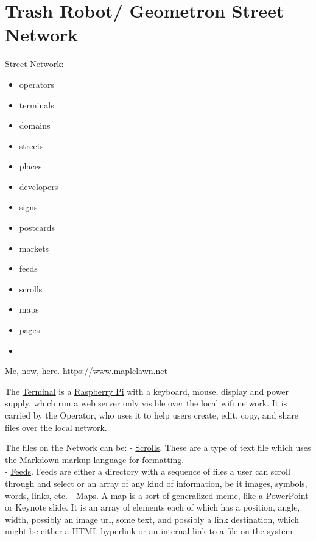 \section{Trash Robot/ Geometron Street
Network}\label{trash-robot-geometron-street-network}


Street Network:

\begin{itemize}
  \tightlist
  \item
  operators  
  \item
  terminals
  \item
  domains
  \item
  streets
  \item
  places
  \item
  developers
  \item
  signs
  \item 
  postcards
  \item
  markets
  \item
  feeds
  \item
  scrolls
  \item
  maps
  \item
  pages
  \item  
\end{itemize}


Me, now, here. \url{https://www.maplelawn.net}


The \href{scrolls/terminal.md}{Terminal} is a
\href{https://www.raspberrypi.org/}{Raspberry Pi} with a keyboard,
mouse, display and power supply, which run a web server only visible
over the local wifi network. It is carried by the Operator, who uses it
to help users create, edit, copy, and share files over the local
network.

The files on the Network can be: - \href{scrolls/scrolls.md}{Scrolls}.
These are a type of text file which uses the
\href{https://daringfireball.net/projects/markdown/}{Markdown markup
language} for formatting.\\
- \href{scrolls/feeds.md}{Feeds}. Feeds are either a directory with a
sequence of files a user can scroll through and select or an array of
any kind of information, be it images, symbols, words, links, etc. -
\href{scrolls/maps.md}{Maps}. A map is a sort of generalized meme, like
a PowerPoint or Keynote slide. It is an array of elements each of which
has a position, angle, width, possibly an image url, some text, and
possibly a link destination, which might be either a HTML hyperlink or
an internal link to a file on the system

